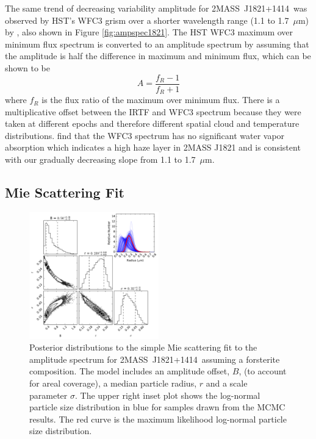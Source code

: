 \documentclass[twocolumn]{aastex6}
\newcommand{\shb}{2MASS~J1821+1414}
\begin{document}
The same trend of decreasing variability amplitude for \shb\ was observed by HST's WFC3 grism over a shorter wavelength range (1.1 to 1.7~$\mu$m) by \citet{2015ApJ...798L..13Y}, also shown in Figure \ref{fig:ampspec1821}.
The HST WFC3 maximum over minimum flux spectrum is converted to an amplitude spectrum by assuming that the amplitude is half the difference in maximum and minimum flux, which can be shown to be 
\begin{equation}\label{eq:ampFromRatio}
A  = \frac{f_R - 1}{f_R + 1}
\end{equation}
where $f_R$ is the flux ratio of the maximum over minimum flux.
There is a multiplicative offset between the IRTF and WFC3 spectrum because they were taken at different epochs and therefore different spatial cloud and temperature distributions.
\citet{2015ApJ...798L..13Y} find that the WFC3 spectrum has no significant water vapor absorption which indicates a high haze layer in 2MASS J1821 and is consistent with our gradually decreasing slope from 1.1 to 1.7~$\mu$m.

\subsection{Mie Scattering Fit}

\begin{figure}
\begin{centering}
\includegraphics[width=0.5\textwidth]{corner_j1821_mie_sc.pdf}
\caption{Posterior distributions to the simple Mie scattering fit to the amplitude spectrum for \shb\ assuming a forsterite composition.
The model includes an amplitude offset, $B$, (to account for areal coverage), a median particle radius, $r$ and a scale parameter $\sigma$.
The upper right inset plot shows the log-normal particle size distribution in blue for samples drawn from the MCMC results.
The red curve is the maximum likelihood log-normal particle size distribution.}\label{fig:corner1821mie}
\end{centering}
\end{figure}
\end{document}
